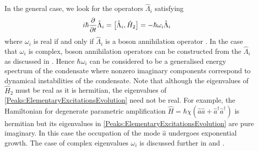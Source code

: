 In the general case, we look for the operators $\hat{\Lambda}_i$ satisfying
\begin{align}
    \label{Peaks:ElementaryExcitationsEvolution}
    i \hbar \frac{\partial }{\partial t}\hat{\Lambda}_i &= \comm{\hat{\Lambda}_i, \hat{H}_2 } = - \hbar \omega_i \hat{\Lambda}_i
\end{align}
where $\omega_i$ is real if and only if $\hat{\Lambda}_i$ is a boson annihilation operator \citep{Leonhardt:2003}. In the case that $\omega_i$ is complex, boson annihilation operators can be constructed from the $\hat{\Lambda}_i$ as discussed in . Hence $\hbar\omega_i$ can be considered to be a generalised energy spectrum of the condensate where nonzero imaginary components correspond to dynamical instabilities of the condensate. Note that although the eigenvalues of $\hat{H}_2$ must be real as it is hermitian, the eigenvalues of \eqref{Peaks:ElementaryExcitationsEvolution} need not be real. For example, the Hamiltonian for degenerate parametric amplification $\hat{H} = \hbar\chi \left(\hat{a}\hat{a} + \hat{a}^\dagger \hat{a}^\dagger \right)$ is hermitian but its eigenvalues in \eqref{Peaks:ElementaryExcitationsEvolution} are pure imaginary. In this case the occupation of the mode $\hat{a}$ undergoes exponential growth. The case of complex eigenvalues $\omega_i$ is discussed further in  and .

